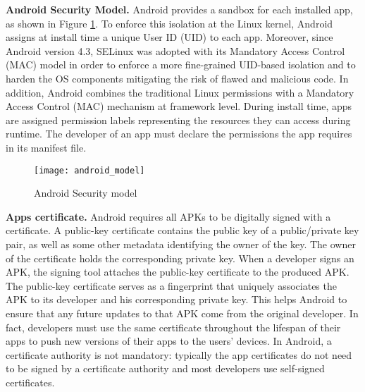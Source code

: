 \textbf{Android Security Model.} Android provides a sandbox for each installed app, as shown in Figure \ref{fig:androidmodel}. To enforce this isolation at the Linux kernel, Android assigns at install time a unique User ID (UID) to each app. 
Moreover, since Android version 4.3, SELinux was adopted with its Mandatory Access Control (MAC) model in order  to enforce a more fine-grained UID-based isolation and to harden the OS components mitigating the risk of flawed and malicious code.  In addition, Android combines the traditional Linux permissions with a Mandatory Access Control (MAC) mechanism at framework level. During install time, apps are assigned permission labels representing the resources they can access during runtime. The developer of an app must declare the permissions the app requires in its manifest file. 

\begin{figure}[H]
\centering
\texttt{[image: android\_model]}
\caption{Android Security model}
\label{fig:androidmodel}
\end{figure}


\iffalse
\begin{figure*}[!h]
\subfigure[Android execution model]{
\centering
\texttt{[image: android\_model]}
\label{fig:sandbox-creation}
}
~%
\subfigure[\asd execution design]{
\centering
\texttt{[image: lightbox\_model]}
\label{fig:design}
}
\caption{LightBox (a) On-Device , (b) Sandbox Service}
\label{fig:lightbox}
\end{figure*}
\fi


\textbf{Apps certificate.}  Android requires  all APKs to be digitally signed with a certificate. A public-key certificate contains the public key of a public/private key pair, as well as some other metadata identifying the owner of the key. The owner of the certificate holds the corresponding private key. When a developer signs an APK, the signing tool attaches the public-key certificate to the produced APK. The public-key certificate serves as a fingerprint that uniquely associates the APK to its developer and his corresponding private key. This helps Android to ensure that any future updates to that APK  come from the original developer. In fact, developers must use the same certificate throughout the lifespan of their apps to push new versions of their apps to the users' devices. In Android, a certificate authority is not mandatory: typically the app certificates do not need to be signed by a certificate authority and most developers use self-signed certificates.


